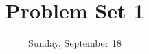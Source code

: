 \documentclass{article}
\title{Problem Set 1}
\date{Sunday, September 18}
\begin{document}
\maketitle

\begin{enumerate}
    
\end{enumerate}
\end{document}

